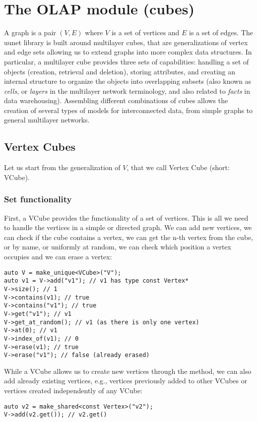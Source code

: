 \chapter{The OLAP module (cubes)}

A graph is a pair $(V,E)$ where $V$ is a set of vertices and $E$ is a set of edges. The uunet library is built around multilayer cubes, that are generalizations of vertex and edge sets allowing us to extend graphs into more complex data structures. In particular, a multilayer cube provides three sets of capabilities: handling a set of objects (creation, retrieval and deletion), storing attributes, and creating an internal structure to organize the objects into overlapping subsets (also known as \emph{cells}, or \emph{layers} in the multilayer network terminology, and also related to \emph{facts} in data warehousing). Assembling different combinations of cubes allows the creation of several types of models for interconnected data, from simple graphs to general multilayer networks.


\section{Vertex Cubes}

Let us start from the generalization of $V$, that we call Vertex Cube (short: VCube).

\subsection{Set functionality}

First, a VCube provides the functionality of a set of vertices. This is all we need to handle the vertices in a simple or directed graph. We can add new vertices, we can check if the cube contains a vertex, we can get the n-th vertex from the cube, or by name, or uniformly at random, we can check which position a vertex occupies and we can erase a vertex:

\begin{lstlisting}[style=c++]
auto V = make_unique<VCube>("V");
auto v1 = V->add("v1"); // v1 has type const Vertex*
V->size(); // 1
V->contains(v1); // true
V->contains("v1"); // true
V->get("v1"); // v1
V->get_at_random(); // v1 (as there is only one vertex)
V->at(0); // v1
V->index_of(v1); // 0
V->erase(v1); // true
V->erase("v1"); // false (already erased)
\end{lstlisting}

While a VCube allows us to create new vertices through the  method, we can also add already existing vertices, e.g., vertices previously added to other VCubes or vertices created independently of any VCube:
\begin{lstlisting}[style=c++]
auto v2 = make_shared<const Vertex>("v2");
V->add(v2.get()); // v2.get()
\end{lstlisting}

